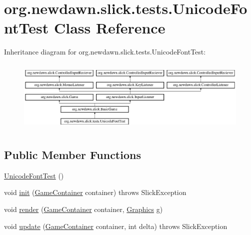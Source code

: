 \hypertarget{classorg_1_1newdawn_1_1slick_1_1tests_1_1_unicode_font_test}{}\section{org.\+newdawn.\+slick.\+tests.\+Unicode\+Font\+Test Class Reference}
\label{classorg_1_1newdawn_1_1slick_1_1tests_1_1_unicode_font_test}
Inheritance diagram for org.\+newdawn.\+slick.\+tests.\+Unicode\+Font\+Test\+:\begin{figure}[H]
\begin{center}
\leavevmode
\includegraphics[height=3.522012cm]{classorg_1_1newdawn_1_1slick_1_1tests_1_1_unicode_font_test}
\end{center}
\end{figure}
\subsection*{Public Member Functions}
\begin{DoxyCompactItemize}
\item 
\mbox{\hyperlink{classorg_1_1newdawn_1_1slick_1_1tests_1_1_unicode_font_test_ac21683decce5c4a0fd9cf077aa2261df}{Unicode\+Font\+Test}} ()
\item 
void \mbox{\hyperlink{classorg_1_1newdawn_1_1slick_1_1tests_1_1_unicode_font_test_a6ff30ae53e15f364bbd587d9d203968e}{init}} (\mbox{\hyperlink{classorg_1_1newdawn_1_1slick_1_1_game_container}{Game\+Container}} container)  throws Slick\+Exception 
\item 
void \mbox{\hyperlink{classorg_1_1newdawn_1_1slick_1_1tests_1_1_unicode_font_test_ad13018ace3c5718bf77cab61408dfdb2}{render}} (\mbox{\hyperlink{classorg_1_1newdawn_1_1slick_1_1_game_container}{Game\+Container}} container, \mbox{\hyperlink{classorg_1_1newdawn_1_1slick_1_1_graphics}{Graphics}} g)
\item 
void \mbox{\hyperlink{classorg_1_1newdawn_1_1slick_1_1tests_1_1_unicode_font_test_a13997b1d2ceff2134f92782f661a44ce}{update}} (\mbox{\hyperlink{classorg_1_1newdawn_1_1slick_1_1_game_container}{Game\+Container}} container, int delta)  throws Slick\+Exception 
\end{DoxyCompactItemize}
